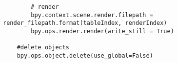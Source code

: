 \begin{lstlisting}
        # render
        bpy.context.scene.render.filepath = render_filepath.format(tableIndex, renderIndex)
        bpy.ops.render.render(write_still = True)

    #delete objects
    bpy.ops.object.delete(use_global=False)
\end{lstlisting}
